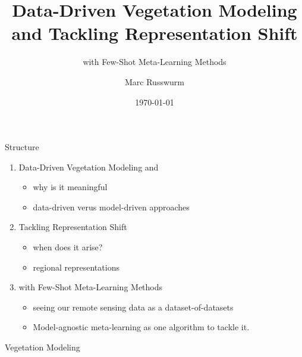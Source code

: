 \documentclass{beamer}
\begin{document}
	
	\title{Data-Driven Vegetation Modeling and Tackling Representation Shift}
	\subtitle{with Few-Shot Meta-Learning Methods}
	\author{Marc Russwurm}
	\date{\today}
	
	
	\begin{frame}[plain]
		\maketitle
	\end{frame}

	\begin{frame}{Structure}
		
		\begin{enumerate}
			\item Data-Driven Vegetation Modeling and 
			\begin{itemize}
				\item why is it meaningful
				\item data-driven verus model-driven approaches
			\end{itemize}
			\item<2-> Tackling Representation Shift 
			\begin{itemize}
				\item when does it arise?
				\item regional representations
			\end{itemize}
			\item<3> with Few-Shot Meta-Learning Methods
			\begin{itemize}
				\item seeing our remote sensing data as a dataset-of-datasets
				\item Model-agnostic meta-learning as one algorithm to tackle it.
			\end{itemize}
		\end{enumerate}
		
	\end{frame}

	\begin{frame}{Vegetation Modeling}
	\end{frame}
\end{document}
